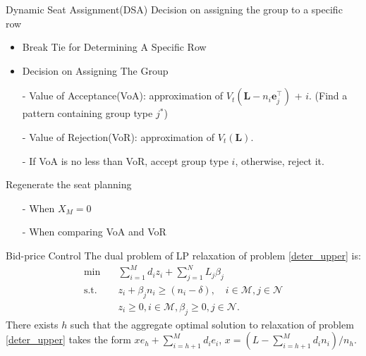     \begin{frame}{Dynamic Seat Assignment(DSA)}
      Decision on assigning the group to a specific row
      \begin{itemize}
        \item Break Tie for Determining A Specific Row
        \item Decision on Assigning The Group
        \item[-] Value of Acceptance(VoA): approximation of $V_{t} (\mathbf{L}-n_i \mathbf{e}_{j}^{\top})$ + $i$. (Find a pattern containing group type $j^{*}$)
        
        \item[-] Value of Rejection(VoR): approximation of $V_{t} (\mathbf{L})$.

        \item[-] If VoA is no less than VoR, accept group type $i$, otherwise, reject it.
      \end{itemize}
      Regenerate the seat planning
      \begin{itemize}
      \item[-] When $X_{M} =0$
      \item[-] When comparing VoA and VoR 
      \end{itemize}
    \end{frame}

      \begin{frame}{Bid-price Control}
        The dual problem of LP relaxation of problem \eqref{deter_upper} is:
        \begin{equation}\label{bid-price_dual}
          \begin{aligned}
          \min \quad & \sum_{i=1}^{M} d_i z_i + \sum_{j= 1}^{N} L_j \beta_{j} \\
          \text {s.t.} \quad & z_{i} + \beta_j n_i \geq (n_i-\delta), \quad i \in \mathcal{M}, j \in \mathcal{N} \\
          & z_{i} \geq 0, i \in \mathcal{M}, \beta_{j} \geq 0, j \in \mathcal{N}.
          \end{aligned}
        \end{equation}
        \small There exists $h$ such that the aggregate optimal solution to relaxation of problem \eqref{deter_upper} takes the form $x e_{h} + \sum_{i=h+1} ^{M} d_{i} e_{i}$, $x = (L- \sum_{i = h+1}^{M} {d_i n_i})/ n_h$.

      \end{frame}

